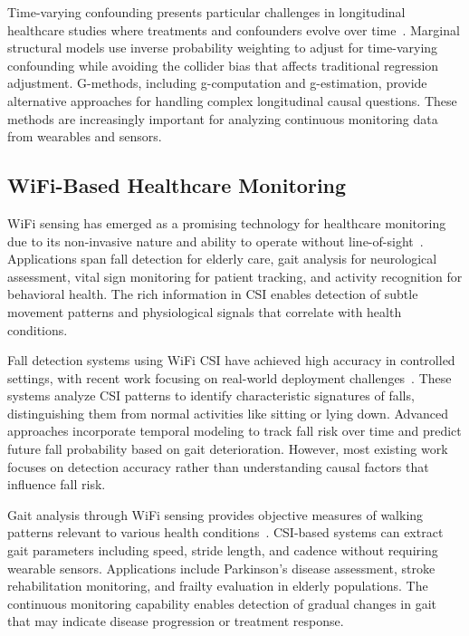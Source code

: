 \documentclass[journal]{IEEEtran}
\begin{document}
Time-varying confounding presents particular challenges in longitudinal healthcare studies where treatments and confounders evolve over time~\cite{timevarying2021}. Marginal structural models use inverse probability weighting to adjust for time-varying confounding while avoiding the collider bias that affects traditional regression adjustment. G-methods, including g-computation and g-estimation, provide alternative approaches for handling complex longitudinal causal questions. These methods are increasingly important for analyzing continuous monitoring data from wearables and sensors.

\subsection{WiFi-Based Healthcare Monitoring}

WiFi sensing has emerged as a promising technology for healthcare monitoring due to its non-invasive nature and ability to operate without line-of-sight~\cite{wifi2023healthcare}. Applications span fall detection for elderly care, gait analysis for neurological assessment, vital sign monitoring for patient tracking, and activity recognition for behavioral health. The rich information in CSI enables detection of subtle movement patterns and physiological signals that correlate with health conditions.

Fall detection systems using WiFi CSI have achieved high accuracy in controlled settings, with recent work focusing on real-world deployment challenges~\cite{fall2023wifi}. These systems analyze CSI patterns to identify characteristic signatures of falls, distinguishing them from normal activities like sitting or lying down. Advanced approaches incorporate temporal modeling to track fall risk over time and predict future fall probability based on gait deterioration. However, most existing work focuses on detection accuracy rather than understanding causal factors that influence fall risk.

Gait analysis through WiFi sensing provides objective measures of walking patterns relevant to various health conditions~\cite{gait2022csi}. CSI-based systems can extract gait parameters including speed, stride length, and cadence without requiring wearable sensors. Applications include Parkinson's disease assessment, stroke rehabilitation monitoring, and frailty evaluation in elderly populations. The continuous monitoring capability enables detection of gradual changes in gait that may indicate disease progression or treatment response.
\end{document}
